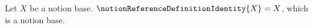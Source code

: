 

\begin{definition}\label{notion_reference_definition_identity}
    Let $X$ be a notion base.
    $\notionReferenceDefinitionIdentity{X}=X$, which is a notion base.
\end{definition}
